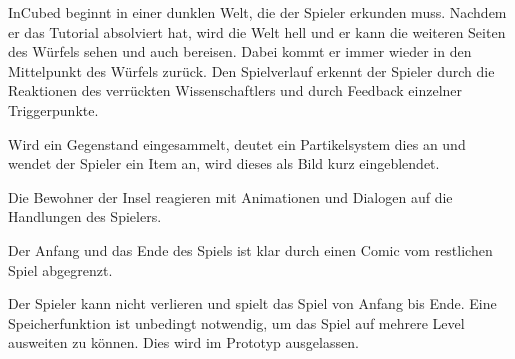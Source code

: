 
InCubed beginnt in einer dunklen Welt, die der Spieler erkunden muss. Nachdem er das Tutorial absolviert hat, wird die Welt hell und er kann die weiteren Seiten des Würfels sehen und auch bereisen. Dabei kommt er immer wieder in den Mittelpunkt des Würfels zurück. Den Spielverlauf erkennt der Spieler durch die Reaktionen des verrückten Wissenschaftlers und durch Feedback einzelner Triggerpunkte.

Wird ein Gegenstand eingesammelt, deutet ein Partikelsystem dies an und wendet der Spieler ein Item an, wird dieses als Bild kurz eingeblendet.

Die Bewohner der Insel reagieren mit Animationen und Dialogen auf die Handlungen des Spielers.

Der Anfang und das Ende des Spiels ist klar durch einen Comic vom restlichen Spiel abgegrenzt.

Der Spieler kann nicht verlieren und spielt das Spiel von Anfang bis Ende. Eine Speicherfunktion ist unbedingt notwendig, um das Spiel auf mehrere Level ausweiten zu können. Dies wird im Prototyp ausgelassen.